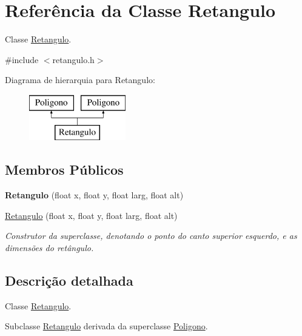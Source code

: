 \hypertarget{classRetangulo}{}\section{Referência da Classe Retangulo}
\label{classRetangulo}


Classe \mbox{\hyperlink{classRetangulo}{Retangulo}}.  




{\ttfamily \#include $<$retangulo.\+h$>$}

Diagrama de hierarquia para Retangulo\+:\begin{figure}[H]
\begin{center}
\leavevmode
\includegraphics[height=2.000000cm]{classRetangulo}
\end{center}
\end{figure}
\subsection*{Membros Públicos}
\begin{DoxyCompactItemize}
\item 
\mbox{\label{classRetangulo_a92ef3678e78c886880e62e181684104a}} 
{\bfseries Retangulo} (float x, float y, float larg, float alt)
\item 
\mbox{\hyperlink{classRetangulo_a92ef3678e78c886880e62e181684104a}{Retangulo}} (float x, float y, float larg, float alt)
\begin{DoxyCompactList}\small\item\em Construtor da superclasse, denotando o ponto do canto superior esquerdo, e as dimensões do retângulo. \end{DoxyCompactList}\end{DoxyCompactItemize}


\subsection{Descrição detalhada}
Classe \mbox{\hyperlink{classRetangulo}{Retangulo}}. 

Subclasse \mbox{\hyperlink{classRetangulo}{Retangulo}} derivada da superclasse \mbox{\hyperlink{classPoligono}{Poligono}}. 

